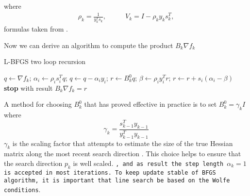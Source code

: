 where
\begin{align}
\rho_{k}= \frac{1}{y^T_{k}s_{k}}, & \qquad
V_{k} = I - \rho_{k} y_{k}s^T_{k},
\end{align}
formulas taken from \cite{numerical}.

Now we can derive an algorithm to compute the product $B_{k}\nabla f_{k}$

\begin{algorithm}[H]
	\caption{L-BFGS two loop recursion}
	\label{}
	\begin{algorithmic}[3]
	
		\State $q \gets \nabla f_{k}$;
        \State $ \alpha_{i} \gets \rho_{i}s^T_{i}q$;
        \State $q \gets q - \alpha_{i}y_{i}$; 
      \EndFor
 	  \State $r \gets B^0_{k}q$;
 	  \State $\beta \gets \rho_{i}y^T_{i}r$; 
 	  \State $r \gets r + s_{i}(\alpha_{i}-\beta)$
 	  \EndFor
	  \State \textbf{stop} with result $B_{k}\nabla f_{k}=r$
	\end{algorithmic}
\end{algorithm}


A method for choosing $B^0_{k}$ that has proved effective in practice is to set $B^0_{k}=\gamma_{k}I$  where 
\begin{equation}
\gamma_{k}= \frac{s^T_{k-1}y_{k-1}}{y^T_{k-1}y_{k-1}}
\end{equation}
$\gamma_{k}$ is the scaling factor that attempts to estimate the size of the true Hessian matrix along the most recent search direction \cite{numerical}. This choice helps to ensure that the search direction $p_{k}$ is well scaled. \texttt{, and as result the step length $\alpha_{k}=1$ is accepted in most iterations. To keep update stable of BFGS algorithm, it is important that line search be based on the Wolfe conditions}.

